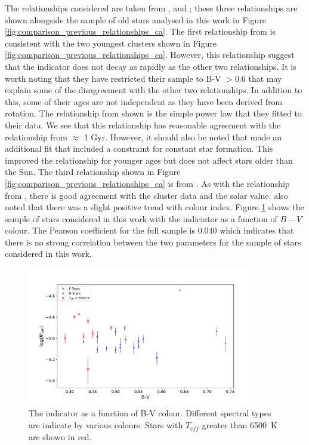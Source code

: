 The relationships considered are taken from \citet{Soderblom_etal_1991}, \citet{Lachaume_etal_1999} and \citet{Mamajek_Hillenbrand_2008}; these three relationships are shown alongside the sample of old stars analysed in this work in Figure \ref{fig:comparison_previous_relationships_ca}. The first relationship from \citet{Lachaume_etal_1999} is consistent with the two youngest clusters shown in Figure \ref{fig:comparison_previous_relationships_ca}. However, this relationship suggest that the \Rprime indicator does not decay as rapidly as the other two relationships. It is worth noting that they have restricted their sample to B-V $> 0.6$ that may explain some of the disagreement with the other two relationships. In addition to this, some of their ages are not independent as they have been derived from rotation. The relationship from \citet{Soderblom_etal_1991} shown is the simple power law that they fitted to their data. We see that this relationship has reasonable agreement with the \citet{Mamajek_Hillenbrand_2008} relationship from $\approx$ 1 Gyr. However, it should also be noted that \citet{Soderblom_etal_1991} made an additional fit that included a constraint for constant star formation. This improved the relationship for younger ages but does not affect stars older than the Sun. The third relationship shown in Figure \ref{fig:comparison_previous_relationships_ca} is from \citet{Mamajek_Hillenbrand_2008}. As with the relationship from \citet{Soderblom_etal_1991}, there is good agreement with the cluster data and the solar value. \citet{Mamajek_Hillenbrand_2008} also noted that there was a slight positive trend with colour index. Figure \ref{fig:ca_v_bv} shows the sample of stars considered in this work with the \Rprime indiciator as a function of $B-V$ colour. The Pearson coefficient for the full sample is $0.040$ which indicates that there is no strong correlation between the two parameters for the sample of stars considered in this work.

\begin{figure}
    \centering
    \includegraphics[width=0.9\textwidth]{Figures/4-Chromospheric_age/all_ca_results_vs_bv.pdf}
    \caption[\Rprime as a function of B-V colour]{The \Rprime indicator as a function of B-V colour. Different spectral types are indicate by various colours. Stars with $T_{eff}$ greater than 6500~K are shown in red.}
    \label{fig:ca_v_bv}
\end{figure}

